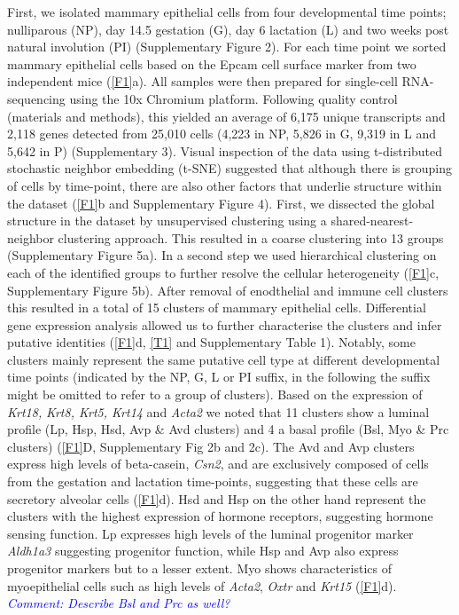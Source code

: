 \documentclass[titlepage, 12pt, oneside]{amsart}
\newcommand{\comment}[1]{\textit{\textcolor{blue}{Comment: #1}}}
\begin{document}
First, we isolated mammary epithelial cells from four developmental time points; nulliparous (NP), day 14.5 gestation (G), day 6 lactation (L) and two weeks post natural involution (PI) (Supplementary Figure 2).
For each time point we sorted mammary epithelial cells based on the Epcam cell surface marker from two independent mice (\autoref{F1}a).
All samples were then prepared for single-cell RNA-sequencing using the 10x Chromium platform\autocite{Zheng2017}.
Following quality control (materials and methods), this yielded an average of 6,175 unique transcripts and 2,118 genes detected from 25,010 cells (4,223 in NP, 5,826 in G, 9,319 in L and 5,642 in P) (Supplementary 3).
Visual inspection of the data using t-distributed stochastic neighbor embedding (t-SNE) suggested that although there is grouping of cells by time-point, there are also other factors that underlie structure within the dataset (\autoref{F1}b and Supplementary Figure 4).
First, we dissected the global structure in the dataset by unsupervised clustering using a shared-nearest-neighbor clustering approach.
This resulted in a coarse clustering into 13 groups (Supplementary Figure 5a).
In a second step we used hierarchical clustering on each of the identified groups to further resolve the cellular heterogeneity (\autoref{F1}c, Supplementary Figure 5b).
After removal of enodthelial and immune cell clusters this resulted in a total of 15 clusters of mammary epithelial cells.
Differential gene expression analysis allowed us to further characterise the clusters and infer putative identities (\autoref{F1}d, \autoref{T1} and Supplementary Table 1).
Notably, some clusters mainly represent the same putative cell type at different developmental time points (indicated by the NP, G, L or PI suffix, in the following the suffix might be omitted to refer to a group of clusters). 
Based on the expression of \textit{Krt18,} \textit{Krt8, Krt5, Krt14} and \textit{Acta2} we noted that 11 clusters show a luminal profile (Lp, Hsp, Hsd, Avp \& Avd clusters) and 4 a basal profile (Bsl, Myo \& Prc clusters) (\autoref{F1}D, Supplementary Fig 2b and 2c).
The Avd and Avp clusters express high levels of beta-casein, \textit{Csn2}, and are exclusively composed of cells from the gestation and lactation time-points, suggesting that these cells are secretory alveolar cells (\autoref{F1}d).
Hsd and Hsp on the other hand represent the clusters with the highest expression of hormone receptors, suggesting hormone sensing function.
Lp expresses high levels of the luminal progenitor marker \textit{Aldh1a3} suggesting progenitor function, while Hsp and Avp also express progenitor markers but to a lesser extent.
Myo shows characteristics of myoepithelial cells such as high levels of \textit{Acta2}, \textit{Oxtr} and \textit{Krt15} (\autoref{F1}d).
\comment{Describe Bsl and Prc as well?}
\end{document}

